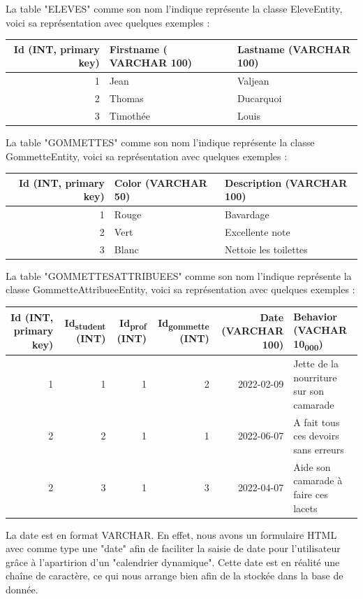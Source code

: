\documentclass[11pt]{article}
\begin{document}
La table "ELEVES" comme son nom l'indique représente la classe EleveEntity, voici sa représentation avec quelques exemples :

\begin{center}
\begin{tabular}{rll}
Id (INT, primary key) & Firstname ( VARCHAR 100) & Lastname (VARCHAR 100)\\
\hline
1 & Jean & Valjean\\
2 & Thomas & Ducarquoi\\
3 & Timothée & Louis\\
\end{tabular}
\end{center}


La table "GOMMETTES" comme son nom l'indique représente la classe GommetteEntity, voici sa représentation avec quelques exemples :

\begin{center}
\begin{tabular}{rll}
Id (INT, primary key) & Color (VARCHAR 50) & Description (VARCHAR 100)\\
\hline
1 & Rouge & Bavardage\\
2 & Vert & Excellente note\\
3 & Blanc & Nettoie les toilettes\\
\end{tabular}
\end{center}


La table "GOMMETTESATTRIBUEES" comme son nom l'indique représente la classe GommetteAttribueeEntity, voici sa représentation avec quelques exemples :

\begin{center}
\begin{tabular}{rrrrrl}
Id (INT, primary key) & Id\textsubscript{student} (INT) & Id\textsubscript{prof} (INT) & Id\textsubscript{gommette} (INT) & Date (VARCHAR 100) & Behavior (VACHAR 10\textsubscript{000})\\
\hline
1 & 1 & 1 & 2 & 2022-02-09 & Jette de la nourriture sur son camarade\\
2 & 2 & 1 & 1 & 2022-06-07 & A fait tous ces devoirs sans erreurs\\
2 & 3 & 1 & 3 & 2022-04-07 & Aide son camarade à faire ces lacets\\
\end{tabular}
\end{center}


La date est en format VARCHAR. En effet, nous avons un formulaire HTML avec comme type une "date" afin de faciliter la saisie de date pour l'utilisateur grâce à l'apartirion d'un "calendrier dynamique". Cette date est en réalité une chaîne de caractère, ce qui nous arrange bien afin de la stockée dans la base de donnée.
\end{document}
